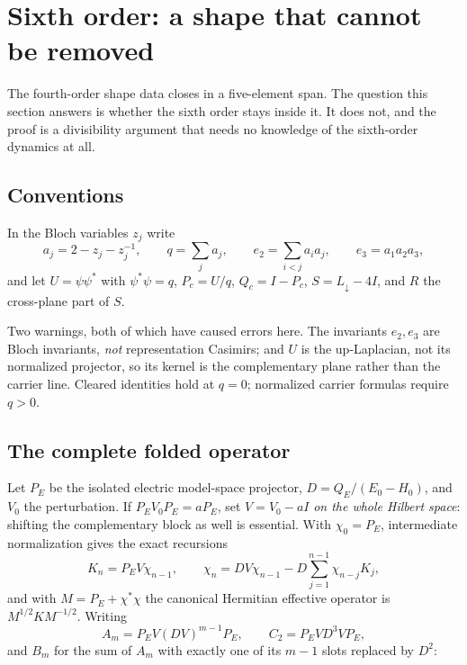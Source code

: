 \section{Sixth order: a shape that cannot be removed}
\label{sec:sixth}

The fourth-order shape data closes in a five-element span. The question
this section answers is whether the sixth order stays inside it. It does
not, and the proof is a divisibility argument that needs no knowledge of
the sixth-order dynamics at all.

\subsection{Conventions}

In the Bloch variables $z_j$ write
\begin{equation}
  a_j = 2 - z_j - z_j^{-1},
  \qquad q = \sum_j a_j,
  \qquad e_2 = \sum_{i<j} a_i a_j,
  \qquad e_3 = a_1 a_2 a_3 ,
\end{equation}
and let $U = \psi\psi^{*}$ with $\psi^{*}\psi = q$, $P_c = U/q$,
$Q_c = I - P_c$, $S = L_{\downarrow} - 4I$, and $R$ the cross-plane part
of $S$.

Two warnings, both of which have caused errors here. The invariants
$e_2, e_3$ are Bloch invariants, \emph{not} representation Casimirs;
and $U$ is the up-Laplacian, not its normalized projector, so its kernel
is the complementary plane rather than the carrier line. Cleared
identities hold at $q = 0$; normalized carrier formulas require
$q > 0$.

\subsection{The complete folded operator}

Let $P_E$ be the isolated electric model-space projector,
$D = Q_E/(E_0 - H_0)$, and $V_0$ the perturbation. If
$P_E V_0 P_E = a P_E$, set $V = V_0 - aI$ \emph{on the whole Hilbert
space}: shifting the complementary block as well is essential. With
$\chi_0 = P_E$, intermediate normalization gives the exact recursions
\begin{equation}
  K_n = P_E V \chi_{n-1},
  \qquad
  \chi_n = D V \chi_{n-1} - D \sum_{j=1}^{n-1} \chi_{n-j} K_j ,
\end{equation}
and with $M = P_E + \chi^{*}\chi$ the canonical Hermitian effective
operator is $M^{1/2} K M^{-1/2}$. Writing
\begin{equation}
  A_m = P_E V (DV)^{m-1} P_E,
  \qquad
  C_2 = P_E V D^3 V P_E,
\end{equation}
and $B_m$ for the sum of $A_m$ with exactly one of its $m-1$ slots
replaced by $D^2$:

